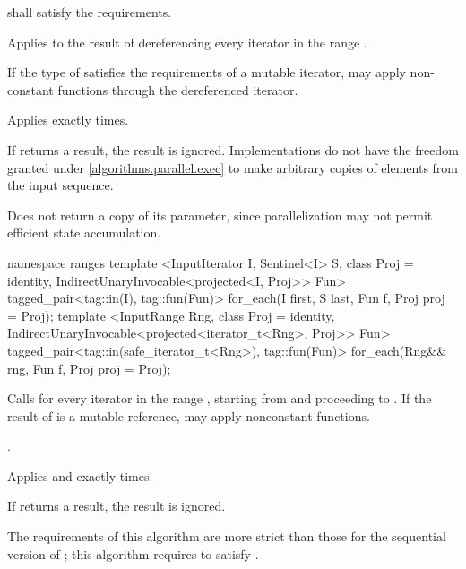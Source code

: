\begin{itemdescr}
\pnum
\requires
{} shall satisfy the  requirements.

\pnum
\effects
Applies  to the result of dereferencing every iterator in the range
.
\begin{note}
If the type of  satisfies the requirements of a mutable iterator,
 may apply non-constant functions through the dereferenced iterator.
\end{note}

\pnum
\complexity
Applies  exactly  times.

\pnum
\remarks
If  returns a result, the result is ignored.
Implementations do not
have the freedom granted under \ref{algorithms.parallel.exec} to make arbitrary
copies of elements from the input sequence.

\pnum
\begin{note}
Does not return a copy of its  parameter, since
parallelization may not permit efficient state accumulation.
\end{note}
\end{itemdescr}

\begin{addedblock}
%
\begin{itemdecl}
namespace ranges {
  template <InputIterator I, Sentinel<I> S, class Proj = identity,
            IndirectUnaryInvocable<projected<I, Proj>> Fun>
    tagged_pair<tag::in(I), tag::fun(Fun)>
      for_each(I first, S last, Fun f, Proj proj = Proj{});
  template <InputRange Rng, class Proj = identity,
            IndirectUnaryInvocable<projected<iterator_t<Rng>, Proj>> Fun>
    tagged_pair<tag::in(safe_iterator_t<Rng>), tag::fun(Fun)>
      for_each(Rng&& rng, Fun f, Proj proj = Proj{});
}
\end{itemdecl}

\begin{itemdescr}
\pnum
\effects
Calls
 for every iterator
 in the range
,
starting from
and proceeding to
.
\enternote If the result of
 is a mutable reference,  may apply
nonconstant functions.\exitnote

\pnum
\returns
{}.

\pnum
\complexity
Applies  and 
exactly
times.

\pnum
\remarks
If  returns a result, the result is ignored.

\pnum
\enternote The requirements of this algorithm are more strict than those
for the sequential version of ; this algorithm requires
 to satisfy . \exitnote
\end{itemdescr}
\end{addedblock}

